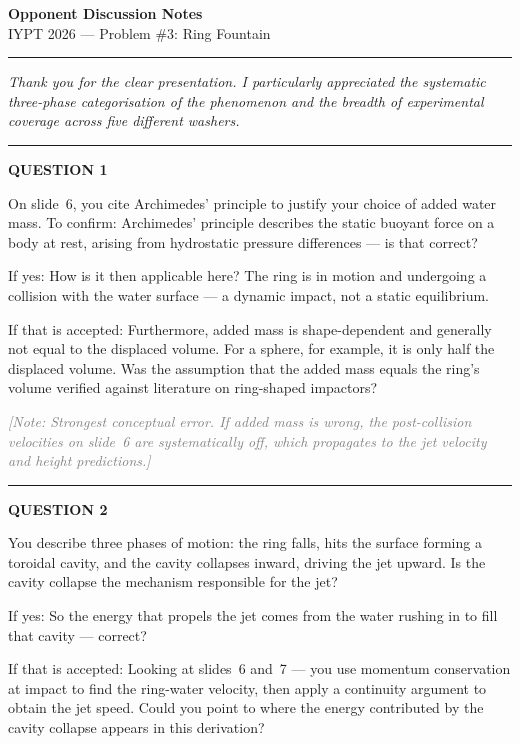 \documentclass[a4paper,11pt]{article}
\newcommand{\qtitle}[1]{{\small\textbf{QUESTION #1}}\par\smallskip}
\newcommand{\qdivider}{\vspace{0.7em}\noindent\rule{\textwidth}{0.4pt}\vspace{0.7em}}
\begin{document}
\begin{center}
  {\large\textbf{Opponent Discussion Notes}}\\[0.3em]
  {\normalsize IYPT 2026 --- Problem \#3: Ring Fountain}
\end{center}

\vspace{1em}
\noindent\rule{\textwidth}{0.8pt}
\vspace{0.5em}

\noindent\textit{Thank you for the clear presentation. I particularly appreciated the systematic three-phase categorisation of the phenomenon and the breadth of experimental coverage across five different washers.}

\qdivider

\qtitle{1}
On slide~6, you cite Archimedes' principle to justify your choice of added water mass. To confirm: Archimedes' principle describes the static buoyant force on a body at rest, arising from hydrostatic pressure differences --- is that correct?

\medskip
\noindent\hspace{1.5em}If yes: How is it then applicable here? The ring is in motion and undergoing a collision with the water surface --- a dynamic impact, not a static equilibrium.

\medskip
\noindent\hspace{1.5em}If that is accepted: Furthermore, added mass is shape-dependent and generally not equal to the displaced volume. For a sphere, for example, it is only half the displaced volume. Was the assumption that the added mass equals the ring's volume verified against literature on ring-shaped impactors?

\medskip
\noindent\textcolor{gray}{\small\itshape [Note: Strongest conceptual error. If added mass is wrong, the post-collision velocities on slide~6 are systematically off, which propagates to the jet velocity and height predictions.]}

\qdivider

\qtitle{2}
You describe three phases of motion: the ring falls, hits the surface forming a toroidal cavity, and the cavity collapses inward, driving the jet upward. Is the cavity collapse the mechanism responsible for the jet?

\medskip
\noindent\hspace{1.5em}If yes: So the energy that propels the jet comes from the water rushing in to fill that cavity --- correct?

\medskip
\noindent\hspace{1.5em}If that is accepted: Looking at slides~6 and~7 --- you use momentum conservation at impact to find the ring-water velocity, then apply a continuity argument to obtain the jet speed. Could you point to where the energy contributed by the cavity collapse appears in this derivation?
\end{document}
